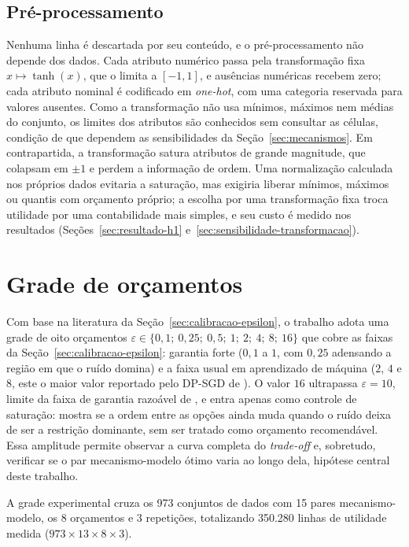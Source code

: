 \subsection{Pré-processamento}
\label{sec:preprocessamento}

Nenhuma linha é descartada por seu conteúdo, e o pré-processamento não depende dos dados. Cada atributo numérico passa pela transformação fixa $x \mapsto \tanh(x)$, que o limita a $[-1, 1]$, e ausências numéricas recebem zero; cada atributo nominal é codificado em \textit{one-hot}, com uma categoria reservada para valores ausentes. Como a transformação não usa mínimos, máximos nem médias do conjunto, os limites dos atributos são conhecidos sem consultar as células, condição de que dependem as sensibilidades da Seção~\ref{sec:mecanismos}. Em contrapartida, a transformação satura atributos de grande magnitude, que colapsam em $\pm 1$ e perdem a informação de ordem. Uma normalização calculada nos próprios dados evitaria a saturação, mas exigiria liberar mínimos, máximos ou quantis com orçamento próprio; a escolha por uma transformação fixa troca utilidade por uma contabilidade mais simples, e seu custo é medido nos resultados (Seções~\ref{sec:resultado-h1} e~\ref{sec:sensibilidade-transformacao}).

\section{Grade de orçamentos}
\label{sec:grade-epsilon}

Com base na literatura da Seção~\ref{sec:calibracao-epsilon}, o trabalho adota uma grade de oito orçamentos $\varepsilon \in \{0{,}1;\allowbreak\ 0{,}25;\allowbreak\ 0{,}5;\allowbreak\ 1;\allowbreak\ 2;\allowbreak\ 4;\allowbreak\ 8;\allowbreak\ 16\}$ que cobre as faixas da Seção~\ref{sec:calibracao-epsilon}: garantia forte ($0{,}1$ a $1$, com $0{,}25$ adensando a região em que o ruído domina) e a faixa usual em aprendizado de máquina ($2$, $4$ e $8$, este o maior valor reportado pelo DP-SGD de ). O valor $16$ ultrapassa $\varepsilon = 10$, limite da faixa de garantia razoável de , e entra apenas como controle de saturação: mostra se a ordem entre as opções ainda muda quando o ruído deixa de ser a restrição dominante, sem ser tratado como orçamento recomendável. Essa amplitude permite observar a curva completa do \textit{trade-off} e, sobretudo, verificar se o par mecanismo-modelo ótimo varia ao longo dela, hipótese central deste trabalho.

A grade experimental cruza os 973 conjuntos de dados com 15 pares mecanismo-modelo, os 8 orçamentos e 3 repetições, totalizando 350.280 linhas de utilidade medida ($973 \times 13 \times 8 \times 3$).

